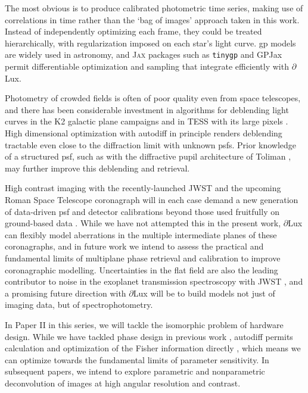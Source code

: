 \documentclass[]{spieman}
\newcommand\jax{\textsc{Jax}\xspace}
\newcommand\dlux{$\partial$Lux\xspace}
\begin{document}
The most obvious is to produce calibrated photometric time series, making use of correlations in time rather than the `bag of images' approach taken in this work. Instead of independently optimizing each frame, they could be treated hierarchically, with regularization imposed on each star's light curve. \ac{gp} models are widely used in astronomy, and \jax packages such as \texttt{tinygp} \cite{Aigrain2022} and GPJax \cite{Pinder2022} permit differentiable optimization and sampling that integrate efficiently with \dlux. 

Photometry of crowded fields is often of poor quality even from space telescopes, and there has been considerable investment in algorithms for deblending light curves in the K2 galactic plane campaigns \cite{Zhu2017} and in TESS with its large pixels \cite{Nardiello2019,Hedges2021,Higgins2022}. High dimensional optimization with autodiff in principle renders deblending tractable even close to the diffraction limit with unknown \ac{psf}s. Prior knowledge of a structured \ac{psf}, such as with the diffractive pupil architecture of Toliman \cite{Guyon2012,Guyon2013}, may further improve this deblending and retrieval. 

High contrast imaging with the recently-launched JWST \cite{Gardner2006} and the upcoming Roman Space Telescope coronagraph \cite{Zellem2022} will in each case demand a new generation of data-driven \ac{psf} and detector calibrations beyond those used fruitfully on ground-based data \cite{Cantalloube2021}. While we have not attempted this in the present work, \dlux can flexibly model aberrations in the multiple intermediate planes of these coronagraphs, and in future work we intend to assess the practical and fundamental limits of multiplane phase retrieval and calibration to improve coronagraphic modelling.
Uncertainties in the flat field are also the leading contributor to noise in the exoplanet transmission spectroscopy with JWST \cite{Rustamkulov2022}, and a promising future direction with \dlux will be to build models not just of imaging data, but of spectrophotometry.

In Paper II in this series, we will tackle the isomorphic problem of hardware design. While we have tackled phase design in previous work \cite{phase_ret_and_design}, autodiff permits calculation and optimization of the Fisher information directly \cite{Coe2009}, which means we can optimize towards the fundamental limits of parameter sensitivity. In subsequent papers, we intend to explore parametric and nonparametric deconvolution of images at high angular resolution and contrast.
\end{document}
